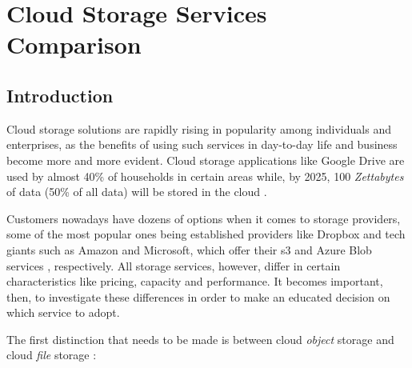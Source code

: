 \chapter{Cloud Storage Services Comparison}

\section{Introduction}
Cloud storage solutions are rapidly rising in popularity among individuals and enterprises, as the benefits of using such services in day-to-day life and business become more and more evident. Cloud storage applications like Google Drive are used by almost 40\% of households in certain areas while, by 2025, 100 \textit{Zettabytes} of data (50\% of all data) will be stored in the cloud \cite{zeta}. 

Customers nowadays have dozens of options when it comes to storage providers, some of the most popular ones being established providers like Dropbox \cite{dropbox} and tech giants such as Amazon and Microsoft, which offer their \ac{s3} and Azure Blob services \cite{s3,blob}, respectively. All storage services, however, differ in certain characteristics like pricing, capacity and performance. It becomes important, then, to investigate these differences in order to make an educated decision on which service to adopt.

The first distinction that needs to be made is between cloud \textit{object} storage and cloud \textit{file} storage \cite{objectvsfile, objectvsfile2}: 

